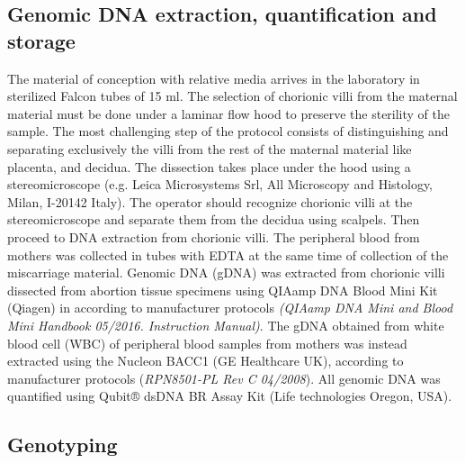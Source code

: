 \documentclass[10pt,letterpaper]{article}
\begin{document}
\subsection*{Genomic DNA extraction, quantification and storage}
\noindent The material of conception with relative media arrives in the laboratory in sterilized Falcon tubes of 15 ml. The selection of chorionic villi from the maternal material must be done under a laminar flow hood to preserve the sterility of the sample. The most challenging step of the protocol consists of distinguishing and separating exclusively the villi from the rest of the maternal material like placenta, and decidua. The dissection takes place under the hood using a stereomicroscope (e.g. Leica Microsystems Srl, All Microscopy and Histology, Milan, I-20142 Italy). The operator should recognize chorionic villi at the stereomicroscope and separate them from the decidua using scalpels. Then proceed to DNA extraction from chorionic villi. The peripheral blood from mothers was collected in tubes with EDTA at the same time of collection of the miscarriage material. Genomic DNA (gDNA) was extracted from chorionic villi dissected from abortion tissue specimens using QIAamp DNA Blood Mini Kit (Qiagen) in according to manufacturer protocols \textit{(QIAamp DNA Mini and Blood Mini Handbook 05/2016. Instruction Manual)}. The gDNA obtained from white blood cell (WBC) of peripheral blood samples from mothers was instead extracted using the Nucleon BACC1 (GE Healthcare UK), according to manufacturer protocols (\textit{RPN8501-PL Rev C 04/2008}). All genomic DNA was quantified using Qubit® dsDNA BR Assay Kit (Life technologies Oregon, USA). 

\subsection*{Genotyping}
\end{document}
